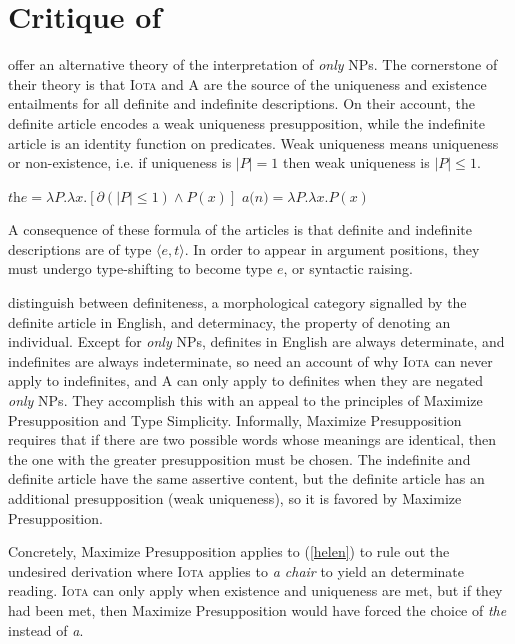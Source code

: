 \section{Critique of \citet{cb2015}\label{sec:coppock-beaver}}
\citet{cb2015} offer an alternative theory of the interpretation of \textit{only} NPs. The cornerstone of their theory is that \textsc{Iota} and \textsc{A} are the source of the uniqueness and existence entailments for all definite and indefinite descriptions. On their account, the definite article encodes a weak uniqueness presupposition, while the indefinite article is an identity function on predicates. Weak uniqueness means uniqueness or non-existence, i.e. if uniqueness is $|P| = 1$ then weak uniqueness is $|P| \le 1$.

\begin{exe}
	\ex $\textit{the} = \lambda P . \lambda x . [\partial(|P| \le 1) \land P(x)]$
	\ex $\textit{a(n)} = \lambda P . \lambda x . P(x)$
\end{exe}

A consequence of these formula of the articles is that definite and indefinite descriptions are of type $\langle e, t \rangle$. In order to appear in argument positions, they must undergo type-shifting to become type $e$, or syntactic raising.

\citeauthor{cb2015} distinguish between definiteness, a morphological category signalled by the definite article in English, and determinacy, the property of denoting an individual. Except for \textit{only} NPs, definites in English are always determinate, and indefinites are always indeterminate, so \citeauthor{cb2015} need an account of why \textsc{Iota} can never apply to indefinites, and \textsc{A} can only apply to definites when they are negated \textit{only} NPs. They accomplish this with an appeal to the principles of Maximize Presupposition and Type Simplicity. Informally, Maximize Presupposition requires that if there are two possible words whose meanings are identical, then the one with the greater presupposition must be chosen. The indefinite and definite article have the same assertive content, but the definite article has an additional presupposition (weak uniqueness), so it is favored by Maximize Presupposition.

Concretely, Maximize Presupposition applies to (\ref{helen}) to rule out the undesired derivation where \textsc{Iota} applies to \textit{a chair} to yield an determinate reading. \textsc{Iota} can only apply when existence and uniqueness are met, but if they had been met, then Maximize Presupposition would have forced the choice of \textit{the} instead of \textit{a}.

